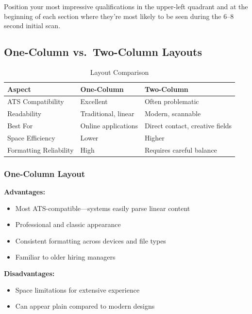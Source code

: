 \documentclass[11pt,a4paper]{article}
\begin{document}
\begin{designtip}
Position your most impressive qualifications in the upper-left quadrant and at the beginning of each section where they're most likely to be seen during the 6--8 second initial scan.
\end{designtip}

\subsection{One-Column vs.\ Two-Column Layouts}

\begin{table}[h]
\centering
\begin{tabular}{@{}lll@{}}
\toprule
\textbf{Aspect} & \textbf{One-Column} & \textbf{Two-Column} \\
\midrule
ATS Compatibility & Excellent & Often problematic \\
Readability & Traditional, linear & Modern, scannable \\
Best For & Online applications & Direct contact, creative fields \\
Space Efficiency & Lower & Higher \\
Formatting Reliability & High & Requires careful balance \\
\bottomrule
\end{tabular}
\caption{Layout Comparison}
\end{table}

\subsubsection{One-Column Layout}

\textbf{Advantages:}
\begin{itemize}
    \item Most ATS-compatible---systems easily parse linear content
    \item Professional and classic appearance
    \item Consistent formatting across devices and file types
    \item Familiar to older hiring managers
\end{itemize}

\textbf{Disadvantages:}
\begin{itemize}
    \item Space limitations for extensive experience
    \item Can appear plain compared to modern designs
\end{itemize}
\end{document}
